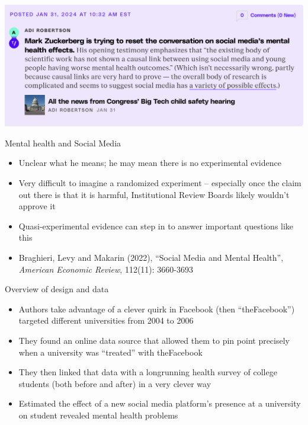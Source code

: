 \documentclass{beamer}
\begin{document}
\begin{frame}
\begin{center}
\includegraphics[scale=0.35]{./lecture_includes/facebook_quote}
\end{center}
\end{frame}



\begin{frame}{Mental health and Social Media}

\begin{itemize}
\item Unclear what he means; he may mean there is no experimental evidence
\item Very difficult to imagine a randomized experiment -- especially once the claim out there is that it is harmful, Institutional Review Boards likely wouldn't approve it
\item Quasi-experimental evidence can step in to answer important questions like this
\item Braghieri, Levy and Makarin (2022), ``Social Media and Mental Health'', \emph{American Economic Review}, 112(11): 3660-3693


\end{itemize}

\end{frame}

\begin{frame}{Overview of design and data}

\begin{itemize}
\item Authors take advantage of a clever quirk in Facebook (then ``theFacebook'') targeted different universities from 2004 to 2006
\item They found an online data source that allowed them to pin point precisely when a university was ``treated'' with theFacebook
\item They then linked that data with a longrunning health survey of college students (both before and after) in a very clever way
\item Estimated the effect of a new social media platform's presence at a university on student revealed mental health problems

\end{itemize}

\end{frame}
\end{document}
